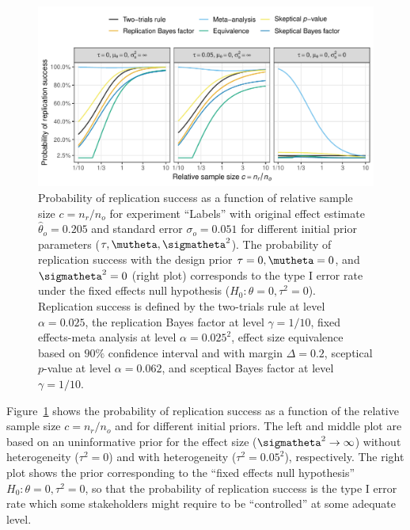 \begin{figure}[!ht]
\begin{knitrout}
\color{fgcolor}
\includegraphics[width=\textwidth]{images/paper3/example-applied-1}
\end{knitrout}
\caption{Probability of replication success as a function of relative sample
  size $c = n_{r}/n_{o}$ for experiment ``Labels'' with original
  effect estimate $\hat{\theta}_{o} = 0.205$ and
  standard error $\sigma_{o} = 0.051$ for
  different initial prior parameters ($\tau, \mutheta, \sigmatheta^{2}$). The
  probability of replication success with the design prior
  $\tau = 0, \mutheta = 0$, and $\sigmatheta^{2} = 0$ (right plot) corresponds
  to the type I error rate under the fixed effects null hypothesis
  ($H_{0}\colon \theta = 0, \tau^{2} = 0$). Replication success is defined by
  the two-trials rule at level $\alpha = 0.025$, the replication
  Bayes factor at level $\gamma = 1/10$, fixed effects-meta
  analysis at level $\alpha = 0.025^{2}$, effect size
  equivalence based on $90\%$ confidence interval and with
  margin $\Delta = 0.2$, sceptical $p$-value at level
  $\alpha = 0.062$, and sceptical Bayes factor at level
  $\gamma = 1/10$.}
\label{fig:example}
\end{figure}
Figure~\ref{fig:example} shows the probability of replication success as a
function of the relative sample size $c = n_{r}/n_{o}$ and for different initial
priors. The left and middle plot are based on an uninformative prior for the
effect size ($\sigmatheta^{2} \to \infty$) without heterogeneity ($\tau^{2} = 0$)
and with heterogeneity ($\tau^{2} = 0.05^{2}$),
respectively. The right plot shows the prior corresponding to the ``fixed
effects null hypothesis'' $H_{0} \colon \theta = 0, \tau^{2} =
0$, %
so that the probability of replication success is the type I error rate which
some stakeholders might require to be ``controlled'' at some adequate level.

